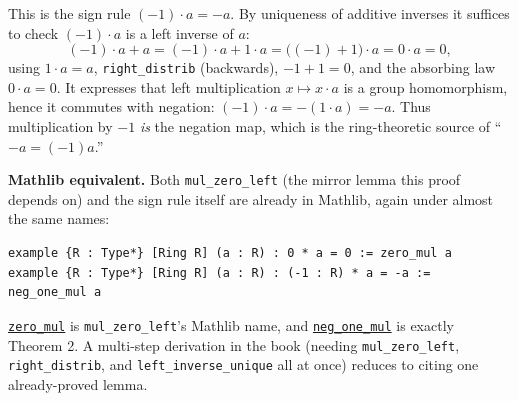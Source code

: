 \begin{mathreading}

This is the sign rule \((-1)\cdot a = -a\). By uniqueness of additive inverses it suffices to check \((-1)\cdot a\) is a left inverse of \(a\): \[
(-1)\cdot a + a = (-1)\cdot a + 1\cdot a = \big((-1) + 1\big)\cdot a
= 0\cdot a = 0,
\] using \(1\cdot a = a\), \texttt{right\_\allowbreak{}distrib} (backwards), \(-1 + 1 = 0\), and the absorbing law \(0\cdot a = 0\). It expresses that left multiplication \(x \mapsto x\cdot a\) is a group homomorphism, hence it commutes with negation: \((-1)\cdot a = -(1\cdot a) = -a\). Thus multiplication by \(-1\) \emph{is} the negation map, which is the ring-theoretic source of ``\(-a = (-1)a\).''

\end{mathreading}

\textbf{Mathlib equivalent.} Both \texttt{mul\_\allowbreak{}zero\_\allowbreak{}left} (the mirror lemma this proof depends on) and the sign rule itself are already in Mathlib, again under almost the same names:

\begin{lstlisting}
example {R : Type*} [Ring R] (a : R) : 0 * a = 0 := zero_mul a
example {R : Type*} [Ring R] (a : R) : (-1 : R) * a = -a := neg_one_mul a
\end{lstlisting}

\href{https://loogle.lean-lang.org/?q=zero_mul}{\texttt{zero\_\allowbreak{}mul}} is \texttt{mul\_\allowbreak{}zero\_\allowbreak{}left}'s Mathlib name, and \href{https://loogle.lean-lang.org/?q=neg_one_mul}{\texttt{neg\_\allowbreak{}one\_\allowbreak{}mul}} is exactly Theorem 2. A multi-step derivation in the book (needing \texttt{mul\_\allowbreak{}zero\_\allowbreak{}left}, \texttt{right\_\allowbreak{}distrib}, and \texttt{left\_\allowbreak{}inverse\_\allowbreak{}unique} all at once) reduces to citing one already-proved lemma.
